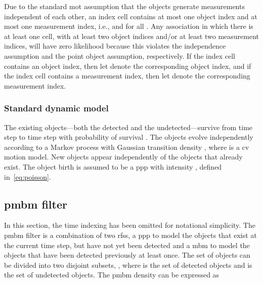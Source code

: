 \documentclass[conference]{IEEEtran}
\begin{document}
Due to the standard \gls{mot} assumption that the objects generate measurements independent of each other, an index cell contains at most one object index and at most one measurement index, i.e.,  and  for all . Any association in which there is at least one cell, with at least two object indices and/or at least two measurement indices, will have zero likelihood because this violates the independence assumption and the point object assumption, respectively. If  the index cell  contains an object index, then let  denote the corresponding object index, and if the index cell  contains a measurement index, then let  denote the corresponding measurement index.

\subsubsection{Standard dynamic model}
\label{sec:StandardDynamicModel}
The existing objects---both the detected and the undetected---survive from time step  to time step  with probability of survival . The objects evolve independently according to a Markov process with Gaussian transition density , where  is a \gls{cv} motion model. New objects appear independently of the objects that already exist. The object birth is assumed to be a \gls{ppp} with intensity , defined in~\cref{eq:poisson}.

\subsection{\gls{pmbm} filter}
In this section, the time indexing has been omitted for notational
simplicity.
The \gls{pmbm} filter is a combination of two \glspl{rfs}, a \gls{ppp}
to model the objects that exist at the current time step, but have
not yet been detected and a \gls{mbm} to model the objects that have
been detected previously at least once.
The set of objects can be divided into two disjoint subsets,
, where  is the set of
detected objects and  is the set of undetected objects.
The \gls{pmbm} density can be expressed as
\end{document}

